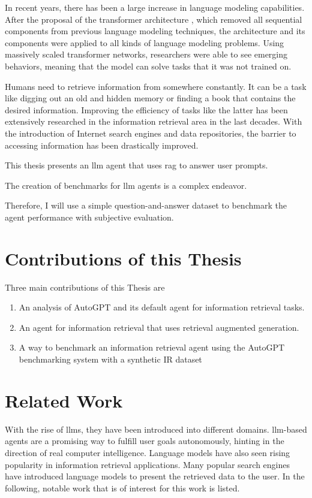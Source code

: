 \documentclass[../main.tex]{subfiles}
\begin{document}
In recent years, there has been a large increase in language modeling capabilities.
After the proposal of the transformer architecture \cite{Vaswani2017},
which removed all sequential components from previous language modeling techniques,
the architecture and its components were applied to all kinds of language modeling problems.
Using massively scaled transformer networks, researchers were able to
see emerging behaviors, meaning that the model can solve tasks that it was not trained on.

Humans need to retrieve information from somewhere constantly.
It can be a task like digging out an old and hidden memory or finding a book that contains the desired information.
Improving the efficiency of tasks like the latter has been extensively researched in the information retrieval area in the last decades.
With the introduction of Internet search engines and data repositories, the barrier to accessing information has been drastically improved.

This thesis presents an \gls{llm} agent that uses \gls{rag} to answer user prompts.

The creation of benchmarks for \gls{llm} agents is a complex endeavor.

Therefore, I will use a simple question-and-answer dataset to benchmark the agent performance with subjective evaluation.

\section{Contributions of this Thesis}

Three main contributions of this Thesis are

\begin{enumerate}
    \item An analysis of AutoGPT and its default agent for information retrieval tasks.
    \item An agent for information retrieval that uses retrieval augmented generation.
    \item A way to benchmark an information retrieval agent using the AutoGPT benchmarking system with a synthetic IR dataset
\end{enumerate}

\section{Related Work}

With the rise of \glspl{llm}, they have been introduced into different domains.
\gls{llm}-based agents are a promising way to fulfill user goals autonomously,
hinting in the direction of real computer intelligence.
Language models have also seen rising popularity in information retrieval applications.
Many popular search engines have introduced language models to present the retrieved data to the user.
In the following, notable work that is of interest for this work is listed.
\end{document}
